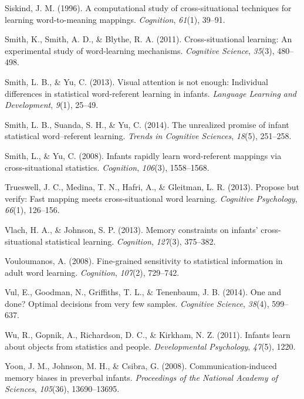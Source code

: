 \documentclass[authoryear, review]{elsarticle}
\begin{document}
\hypertarget{ref-siskind1996computational}{}
Siskind, J. M. (1996). A computational study of cross-situational
techniques for learning word-to-meaning mappings. \emph{Cognition},
\emph{61}(1), 39--91.

\hypertarget{ref-smith2011cross}{}
Smith, K., Smith, A. D., \& Blythe, R. A. (2011). Cross-situational
learning: An experimental study of word-learning mechanisms.
\emph{Cognitive Science}, \emph{35}(3), 480--498.

\hypertarget{ref-smith2013visual}{}
Smith, L. B., \& Yu, C. (2013). Visual attention is not enough:
Individual differences in statistical word-referent learning in infants.
\emph{Language Learning and Development}, \emph{9}(1), 25--49.

\hypertarget{ref-smith2014unrealized}{}
Smith, L. B., Suanda, S. H., \& Yu, C. (2014). The unrealized promise of
infant statistical word--referent learning. \emph{Trends in Cognitive
Sciences}, \emph{18}(5), 251--258.

\hypertarget{ref-smith2008infants}{}
Smith, L., \& Yu, C. (2008). Infants rapidly learn word-referent
mappings via cross-situational statistics. \emph{Cognition},
\emph{106}(3), 1558--1568.

\hypertarget{ref-trueswell2013propose}{}
Trueswell, J. C., Medina, T. N., Hafri, A., \& Gleitman, L. R. (2013).
Propose but verify: Fast mapping meets cross-situational word learning.
\emph{Cognitive Psychology}, \emph{66}(1), 126--156.

\hypertarget{ref-vlach2013memory}{}
Vlach, H. A., \& Johnson, S. P. (2013). Memory constraints on infants'
cross-situational statistical learning. \emph{Cognition}, \emph{127}(3),
375--382.

\hypertarget{ref-vouloumanos2008fine}{}
Vouloumanos, A. (2008). Fine-grained sensitivity to statistical
information in adult word learning. \emph{Cognition}, \emph{107}(2),
729--742.

\hypertarget{ref-vul2014}{}
Vul, E., Goodman, N., Griffiths, T. L., \& Tenenbaum, J. B. (2014). One
and done? Optimal decisions from very few samples. \emph{Cognitive
Science}, \emph{38}(4), 599--637.

\hypertarget{ref-wu2011infants}{}
Wu, R., Gopnik, A., Richardson, D. C., \& Kirkham, N. Z. (2011). Infants
learn about objects from statistics and people. \emph{Developmental
Psychology}, \emph{47}(5), 1220.

\hypertarget{ref-yoon2008communication}{}
Yoon, J. M., Johnson, M. H., \& Csibra, G. (2008). Communication-induced
memory biases in preverbal infants. \emph{Proceedings of the National
Academy of Sciences}, \emph{105}(36), 13690--13695.
\end{document}

